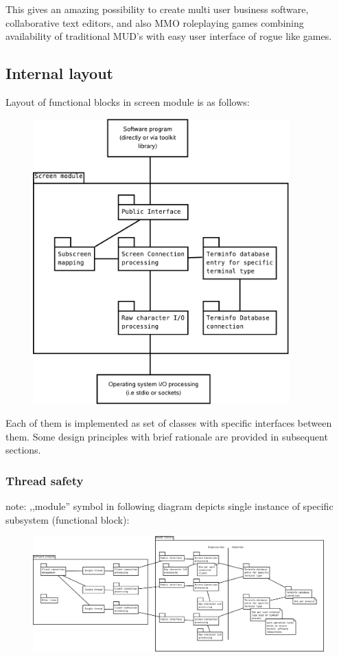   This gives an amazing possibility to create multi user business
  software, collaborative text editors, and also  MMO roleplaying games
  combining availability of traditional MUD's with easy user interface
  of rogue like games. 

\subsection{Internal layout}
  Layout of functional blocks in screen module is as follows:
  
  \begin{figure}[H]
  \begin{center}
  \leavevmode\includegraphics[width=280pt]{graphics/ModuleLayout}
  \end{center}
  \end{figure}
  Each of them is implemented as set of classes with specific
  interfaces between them. Some design principles with brief rationale
  are provided in subsequent sections.


\subsubsection{Thread safety}
  note: ,,module'' symbol in following diagram depicts single instance
  of specific subsystem (functional block):
  \advanced

  \begin{figure}[H]
  \begin{center}
  \leavevmode\includegraphics[width=540pt,angle=270]{graphics/MultiThread}
  \end{center}
  \end{figure}
  
